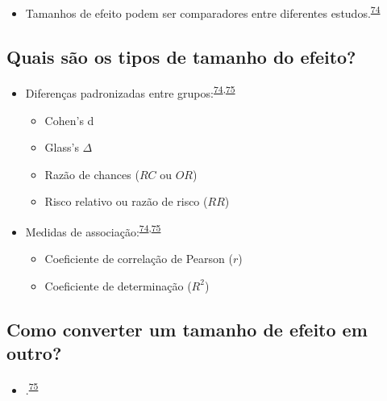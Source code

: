 \documentclass[
]{book}
\providecommand{\tightlist}{%
  \setlength{\itemsep}{0pt}\setlength{\parskip}{0pt}}
\begin{document}
\begin{itemize}
\tightlist
\item
  Tamanhos de efeito podem ser comparadores entre diferentes estudos.\textsuperscript{\protect\hyperlink{ref-Sullivan2012}{74}}
\end{itemize}

\hypertarget{quais-suxe3o-os-tipos-de-tamanho-do-efeito}{%
\subsection{Quais são os tipos de tamanho do efeito?}\label{quais-suxe3o-os-tipos-de-tamanho-do-efeito}}

\begin{itemize}
\item
  Diferenças padronizadas entre grupos:\textsuperscript{\protect\hyperlink{ref-Sullivan2012}{74},\protect\hyperlink{ref-Kim2015}{75}}

  \begin{itemize}
  \item
    Cohen's d
  \item
    Glass's \(\Delta\)
  \item
    Razão de chances (\(RC\) ou \(OR\))
  \item
    Risco relativo ou razão de risco (\(RR\))
  \end{itemize}
\item
  Medidas de associação:\textsuperscript{\protect\hyperlink{ref-Sullivan2012}{74},\protect\hyperlink{ref-Kim2015}{75}}

  \begin{itemize}
  \item
    Coeficiente de correlação de Pearson (\(r\))
  \item
    Coeficiente de determinação (\(R^2\))
  \end{itemize}
\end{itemize}

\hypertarget{como-converter-um-tamanho-de-efeito-em-outro}{%
\subsection{Como converter um tamanho de efeito em outro?}\label{como-converter-um-tamanho-de-efeito-em-outro}}

\begin{itemize}
\tightlist
\item
  .\textsuperscript{\protect\hyperlink{ref-Kim2015}{75}}
\end{itemize}
\end{document}
